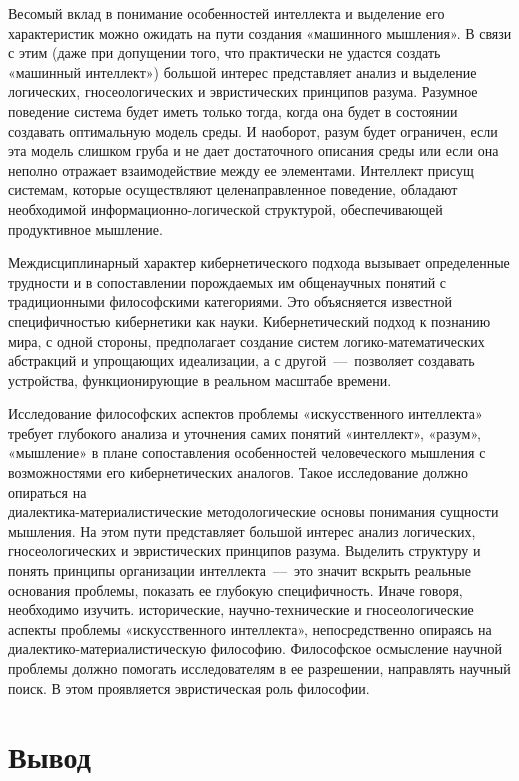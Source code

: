 \documentclass[14pt]{extarticle}
\begin{document}
Весомый вклад в понимание особенностей интеллекта и выделение его характеристик можно ожидать на пути создания «машинного мышления». В связи с этим (даже при допущении того, что практически не удастся создать «машинный интеллект») большой интерес представляет анализ и выделение логических, гносеологических и эвристических принципов разума. Разумное поведение система будет иметь только тогда, когда она будет в состоянии создавать оптимальную модель среды. И наоборот, разум будет ограничен, если эта модель слишком груба и не дает достаточного описания среды или если она неполно отражает взаимодействие между ее элементами. Интеллект присущ системам, которые осуществляют целенаправленное поведение, обладают необходимой информационно-логической структурой, обеспечивающей продуктивное мышление.

Междисциплинарный характер кибернетического подхода вызывает определенные трудности и в сопоставлении порождаемых им общенаучных понятий с традиционными философскими категориями. Это объясняется известной специфичностью кибернетики как науки. Кибернетический подход к познанию мира, с одной стороны, предполагает создание систем логико-математических абстракций и упрощающих идеализации, а с другой~---~позволяет создавать устройства, функционирующие в реальном масштабе времени.

Исследование философских аспектов проблемы «искусственного интеллекта» требует глубокого анализа и уточнения самих понятий «интеллект», «разум», «мышление» в плане сопоставления особенностей человеческого мышления с возможностями его кибернетических аналогов. Такое исследование должно опираться на\\ диалектика-материалистические методологические основы понимания сущности мышления. На этом пути представляет большой интерес анализ логических, гносеологических и эвристических принципов разума. Выделить структуру и понять принципы организации интеллекта~---~это значит вскрыть реальные основания проблемы, показать ее глубокую специфичность. Иначе говоря, необходимо изучить. исторические, научно-технические и гносеологические аспекты проблемы «искусственного интеллекта», непосредственно опираясь на диалектико-материалистическую философию. Философское осмысление научной проблемы должно помогать исследователям в ее разрешении, направлять научный поиск. В этом проявляется эвристическая роль философии.

\section*{Вывод}
\end{document}
